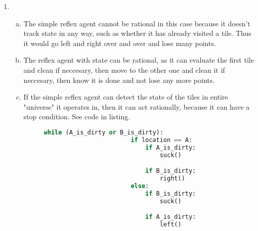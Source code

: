 \begin{enumerate}
\begin{enumerate}[(a)]
        \end{enumerate}
    \item
        \begin{enumerate}[(a)]
            \item
                The simple reflex agent cannot be rational in this case because it doesn't track state in any way, such as whether it has already visited a tile. Thus it would go left and right over and over and lose many points.

            \item
                The reflex agent with state can be rational, as it can evaluate the first tile and clean if neccesary, then move to the other one and clean it if neccesary, then know it is done and not lose any more points.

            \item
                If the simple reflex agent can detect the state of the tiles in entire "universe" it operates in, then it can act rationally, because it can have a stop condition. See code in listing.
                \begin{figure}
                    \begin{lstlisting}[caption=Algorithm (python-like), language=Python, label=algo]
                    while (A_is_dirty or B_is_dirty):
                        if location == A:
                            if A_is_dirty:
                                suck()

                            if B_is_dirty:
                                right()
                        else:
                            if B_is_dirty:
                                suck()

                            if A_is_dirty:
                                left()
                    \end{lstlisting}
                \end{figure}
        \end{enumerate}


\end{enumerate}
